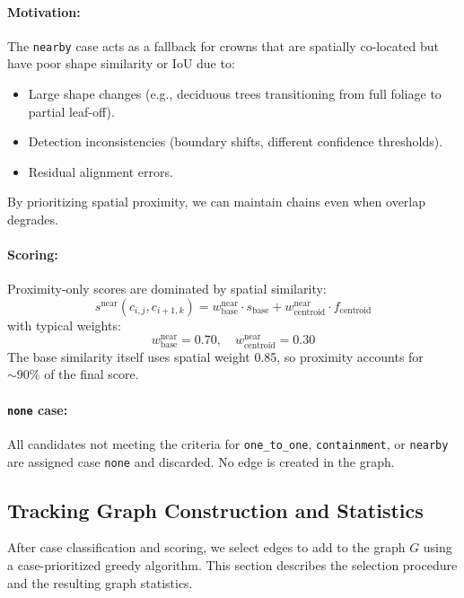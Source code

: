 \paragraph{Motivation:} The \texttt{nearby} case acts as a fallback for crowns that are spatially co-located but have poor shape similarity or IoU due to:
\begin{itemize}
    \item Large shape changes (e.g., deciduous trees transitioning from full foliage to partial leaf-off).
    \item Detection inconsistencies (boundary shifts, different confidence thresholds).
    \item Residual alignment errors.
\end{itemize}
By prioritizing spatial proximity, we can maintain chains even when overlap degrades.

\paragraph{Scoring:} Proximity-only scores are dominated by spatial similarity:
\[
s^{\text{near}}(c_{i,j}, c_{i+1,k}) = w_{\text{base}}^{\text{near}} \cdot s_{\text{base}} + w_{\text{centroid}}^{\text{near}} \cdot f_{\text{centroid}}
\]
with typical weights:
\[
w_{\text{base}}^{\text{near}} = 0.70, \quad w_{\text{centroid}}^{\text{near}} = 0.30
\]
The base similarity itself uses spatial weight 0.85, so proximity accounts for $\sim 90\%$ of the final score.

\paragraph{\texttt{none} case:} All candidates not meeting the criteria for \texttt{one\_to\_one}, \texttt{containment}, or \texttt{nearby} are assigned case \texttt{none} and discarded. No edge is created in the graph.

\subsection{Tracking Graph Construction and Statistics}

After case classification and scoring, we select edges to add to the graph $G$ using a case-prioritized greedy algorithm. This section describes the selection procedure and the resulting graph statistics.


